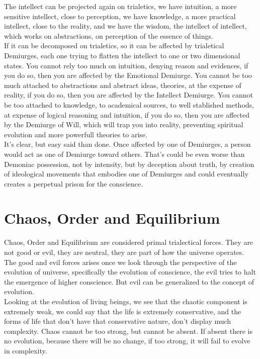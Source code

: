 \documentclass[12pt,a4paper]{article}
\begin{document}
The intellect can be projected again on trialetics, we have intuition, a more sensitive intellect, close to perception, we have knowledge, a more practical intellect, close to the reality, and we have the wisdom, the intellect of intellect, which works on abstractions, on perception of the essence of things. \\

If it can be decomposed on trialetics, so it can be affected by trialetical Demiurges, each one trying to flatten the intellect to one or two dimensional states. You cannot rely too much on intuition, denying reason and evidences, if you do so, then you are affected by the Emotional Demiurge. You cannot be too much attached to abstractions and abstract ideas, theories, at the expense of reality, if you do so, then you are affected by the Intellect Demiurge. You cannot be too attached to knowledge, to academical sources, to well stablished methods, at expense of logical reasoning and intuition, if you do so, then you are affected by the Demiurge of Will, which will trap you into reality, preventing spiritual evolution and more powerfull theories to arise.\\

It's clear, but easy said than done. Once affected by one of Demiurges, a person would act as one of Demiurge toward others. That's could be even worse than Demoniac possession, not by intensity, but by deception about truth, by creation of ideological movements that embodies one of Demiurges and could eventually creates a perpetual prison for the conscience.

\section{Chaos, Order and Equilibrium}

\hspace{\baselineskip}

Chaos, Order and Equilibrium are considered primal trialectical forces. They are not good or evil, they are neutral, they are part of how the universe operates. The good and evil forces arises once we look through the perspective of the evolution of universe, specifically the evolution of conscience, the evil tries to halt the emergence of higher conscience. But evil can be generalized to the concept of evolution. \\

Looking at the evolution of living beings, we see that the chaotic component is extremely weak, we could say that the life is extremely conservative, and the forms of life that don't have that conservative nature, don't display much complexity. Chaos cannot be too strong, but cannot be absent. If absent there is no evolution, because there will be no change, if too strong, it will fail to evolve in complexity. \\
\end{document}
